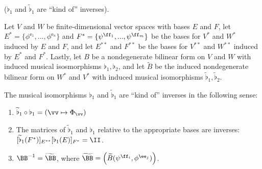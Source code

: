 \begin{theorem}
    \label{ch::bilinear_forms_metric_tensors::thm::B_Btilde_kind_of_inverses}
    ($\flat_1$ and $\widetilde{\flat}_1$ are ``kind of'' inverses).
    
    Let $V$ and $W$ be finite-dimensional vector spaces with bases $E$ and $F$, let $E^* = \{\phi^{\ee_1}, ..., \phi^{\ee_n}\}$ and $F^* = \{\psi^{\ff_1}, ..., \psi^{\ff_m}\}$ be the bases for $V^*$ and $W^*$ induced by $E$ and $F$, and let $E^{**}$ and $F^{**}$ be the bases for $V^{**}$ and $W^{**}$ induced by $E^*$ and $F^*$. Lastly, let $B$ be a nondegenerate bilinear form on $V$ and $W$ with induced musical isosmorphisms $\flat_1, \flat_2$, and let $\widetilde{B}$ be the induced nondegenerate bilinear form on $W^*$ and $V^*$ with induced musical isomorphisms $\widetilde{\flat}_1, \widetilde{\flat}_2$.
    
    The musical isomorphisms $\flat_1$ and $\widetilde{\flat}_1$ are ``kind of'' inverses in the following sense:
     
    \begin{enumerate}
         \item $\widetilde{\flat}_1 \circ \flat_1 = (\vv \mapsto \Phi_\vv)$
        \item The matrices of $\widetilde{\flat}_1$ and $\flat_1$ relative to the appropriate bases are inverses: $[\widetilde{\flat}_1(F^*)]_{E^{**}} [\flat_1(E)]_{F^*} = \II$.
        \item $\BB^{-1} = \widetilde{\BB}$, where $\widetilde{\BB} = \Big(\widetilde{B}(\psi^{\ff_i}, \phi^{\ee_j})\Big)$.
    \end{enumerate}
\end{theorem}
 
